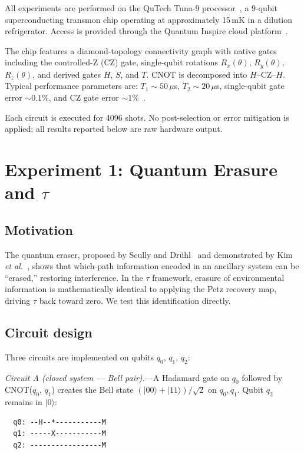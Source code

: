 \documentclass[prl,twocolumn,superscriptaddress,longbibliography,floatfix]{revtex4-2}
\newcommand{\ket}[1]{|#1\rangle}
\newcommand{\tauasym}{\tau}
\begin{document}
All experiments are performed on the QuTech Tuna-9
processor~\cite{Tuna9}, a 9-qubit superconducting transmon chip
operating at approximately 15\,mK in a dilution refrigerator.
Access is provided through the Quantum Inspire cloud
platform~\cite{QI2022}.

The chip features a diamond-topology connectivity graph with native
gates including the controlled-Z (CZ) gate, single-qubit rotations
$R_x(\theta)$, $R_y(\theta)$, $R_z(\theta)$, and derived gates
$H$, $S$, and $T$.  CNOT is decomposed into $H$--CZ--$H$.
Typical performance parameters are: $T_1 \sim 50\,\mu$s,
$T_2 \sim 20\,\mu$s, single-qubit gate error $\sim 0.1\%$, and
CZ gate error $\sim 1\%$~\cite{Tuna9}.

Each circuit is executed for 4096 shots. No post-selection or error
mitigation is applied; all results reported below are raw hardware
output.

\section{Experiment 1: Quantum Erasure and $\tauasym$}
\label{sec:eraser}

\subsection{Motivation}

The quantum eraser, proposed by Scully and
Dr\"{u}hl~\cite{Scully1982} and demonstrated by Kim
\textit{et al.}~\cite{Kim2000}, shows that which-path information
encoded in an ancillary system can be ``erased,'' restoring
interference.  In the $\tauasym$ framework, erasure of environmental
information is mathematically identical to applying the Petz
recovery map, driving $\tauasym$ back toward zero.  We test this
identification directly.

\subsection{Circuit design}

Three circuits are implemented on qubits $q_0$, $q_1$, $q_2$:

\textit{Circuit A (closed system --- Bell pair).}---A Hadamard gate on
$q_0$ followed by CNOT($q_0$, $q_1$) creates the Bell state
$(\ket{00}+\ket{11})/\sqrt{2}$ on $q_0,q_1$.  Qubit $q_2$ remains
in $\ket{0}$:
\begin{verbatim}
  q0: --H--*-----------M
  q1: -----X-----------M
  q2: -----------------M
\end{verbatim}
\end{document}

